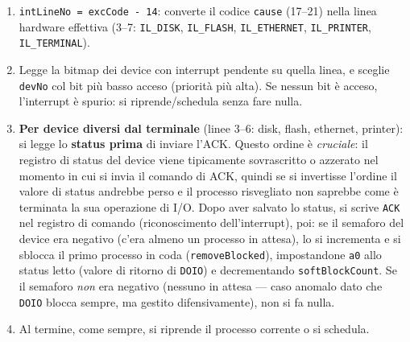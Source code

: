 \documentclass[11pt,a4paper]{article}
\newcommand{\code}[1]{\texttt{#1}}
\begin{document}
\begin{enumerate}
\item \code{intLineNo = excCode - 14}: converte il codice \code{cause}
  (17--21) nella linea hardware effettiva (3--7: \code{IL\_DISK},
  \code{IL\_FLASH}, \code{IL\_ETHERNET}, \code{IL\_PRINTER},
  \code{IL\_TERMINAL}).
\item Legge la bitmap dei device con interrupt pendente su quella linea, e
  sceglie \code{devNo} col bit più basso acceso (priorità più alta). Se
  nessun bit è acceso, l'interrupt è spurio: si riprende/schedula senza
  fare nulla.
\item \textbf{Per device diversi dal terminale} (linee 3--6: disk, flash,
  ethernet, printer): si legge lo \textbf{status prima} di inviare l'ACK.
  Questo ordine è \emph{cruciale}: il registro di status del device viene
  tipicamente sovrascritto o azzerato nel momento in cui si invia il
  comando di ACK, quindi se si invertisse l'ordine il valore di status
  andrebbe perso e il processo risvegliato non saprebbe come è terminata la
  sua operazione di I/O. Dopo aver salvato lo status, si scrive
  \code{ACK} nel registro di comando (riconoscimento dell'interrupt), poi:
  se il semaforo del device era negativo (c'era almeno un processo in
  attesa), lo si incrementa e si sblocca il primo processo in coda
  (\code{removeBlocked}), impostandone \code{a0} allo status letto (valore
  di ritorno di \code{DOIO}) e decrementando \code{softBlockCount}. Se il
  semaforo \emph{non} era negativo (nessuno in attesa --- caso anomalo dato
  che \code{DOIO} blocca sempre, ma gestito difensivamente), non si fa
  nulla.
\item Al termine, come sempre, si riprende il processo corrente o si
  schedula.
\end{enumerate}
\end{document}
